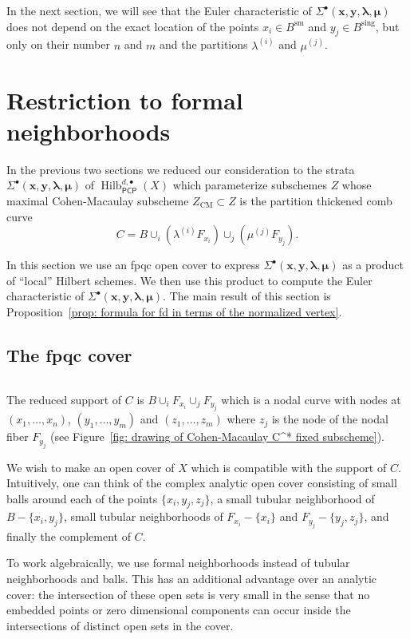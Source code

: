 \documentclass[12pt]{amsart}
\theoremstyle{definition}
\newcommand{\Hilb}{\operatorname{Hilb}}
\newcommand{\CM}{\operatorname{CM}}
\newcommand{\sm}{\operatorname{sm}}
\newcommand{\sing}{\operatorname{sing}}
\newcommand{\boldx}{\boldsymbol{x}}
\newcommand{\boldy}{\boldsymbol{y}}
\newcommand{\boldlambda}{\boldsymbol{\lambda }}
\newcommand{\boldmu}{\boldsymbol{\mu }}
\newcommand{\Sigmaxylambdamu}{\Sigma^{\bullet }(\boldx ,\boldy ,\boldlambda ,\boldmu )}
\newcommand{\PCP}{\mathsf{PCP}}
\newcommand{\presectionspace}{\vspace{0.2cm}} %
\newcommand{\SubSecSpace}{$\,$\vspace{0.2cm}\par } %
\begin{document}
In the next section, we will see that the Euler characteristic of
$\Sigmaxylambdamu $ does not depend on the exact location of
the points $x_i \in B^{\sm}$ and $y_j \in B^{\sing}$, but only on
their number $n$ and $m$ and the partitions $\lambda^{(i)}$ and
$\mu^{(j)}$.



\presectionspace
\section{Restriction to formal neighborhoods} \label{sec: restriction
to formal nghds}

In the previous two sections we reduced our consideration to the
strata $\Sigmaxylambdamu $
of $ \Hilb^{d,\bullet}_{\PCP }(X)$ which parameterize subschemes $Z$ whose maximal
Cohen-Macaulay subscheme $Z_{\CM} \subset Z$ is the partition
thickened comb curve 
\[
C=B\cup_{i}(\lambda^{(i)}F_{x_{i}})\cup_{j}(\mu^{(j)}F_{y_{j}}).
\]

In this section we use an fpqc open cover to express
$\Sigmaxylambdamu$ as a product of ``local'' Hilbert schemes. We then
use this product to compute the Euler characteristic of
$\Sigmaxylambdamu$. The main result of this section is
Proposition~\ref{prop: formula for fd in terms of the normalized
vertex}.


\subsection{The fpqc cover}\label{subsec: the fpqc cover}\SubSecSpace
The reduced support of $C$ is $B\cup_{i}F_{x_{i}}\cup_{j}F_{y_{j}}$
which is a nodal curve with nodes at $(x_{1},\dotsc ,x_{n})$,
$(y_{1},\dotsc ,y_{m})$ and $(z_{1},\dotsc ,z_{m})$ where $z_{j}$ is
the node of the nodal fiber $F_{y_{j}}$ (see Figure~\ref{fig: drawing
of Cohen-Macaulay C^* fixed subscheme}).

We wish to make an open cover of $X$ which is compatible with the
support of $C$. Intuitively, one can think of the complex analytic
open cover consisting of small balls around each of the points
$\{x_{i},y_{j},z_{j} \}$, a small tubular neighborhood of
$B-\{x_{i},y_{j} \}$, small tubular neighborhoods of
$F_{x_{i}}-\{x_{i} \}$ and $F_{y_{j}}-\{y_{j},z_{j} \}$, and finally
the complement of $C$.

To work algebraically, we use formal neighborhoods instead of tubular
neighborhoods and balls. This has an additional advantage over an
analytic cover: the intersection of these open sets is very small in
the sense that no embedded points or zero dimensional components can
occur inside the intersections of distinct open sets in the cover.
\end{document}
